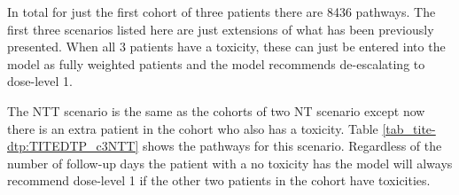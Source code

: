 In total for just the first cohort of three patients there are 8436 pathways. The first three scenarios listed here are just extensions of what has been previously presented. When all 3 patients have a toxicity, these can just be entered into the model as fully weighted patients and the model recommends de-escalating to dose-level 1. 

The NTT scenario is the same as the cohorts of two NT scenario except now there is an extra patient in the cohort who also has a toxicity. Table \ref{tab_tite-dtp:TITEDTP_c3NTT} shows the pathways for this scenario. Regardless of the number of follow-up days the patient with a no toxicity has the model will always recommend dose-level 1 if the other two patients in the cohort have toxicities. 

\begin{table}[H]
	

\end{table}
